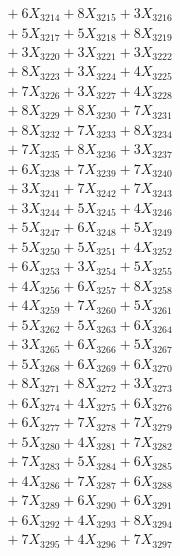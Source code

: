 \documentclass[a4paper,10pt]{article}
\begin{document}
{\begin{align}
&\;  + 6 X_{3214} + 8 X_{3215} + 3 X_{3216} \\[0.3ex]
&\;  + 5 X_{3217} + 5 X_{3218} + 8 X_{3219} \\[0.5ex]\allowbreak
&\;  + 3 X_{3220} + 3 X_{3221} + 3 X_{3222} \\[0.3ex]
&\;  + 8 X_{3223} + 3 X_{3224} + 4 X_{3225} \\[0.3ex]
&\;  + 7 X_{3226} + 3 X_{3227} + 4 X_{3228} \\[0.3ex]
&\;  + 8 X_{3229} + 8 X_{3230} + 7 X_{3231} \\[0.3ex]
&\;  + 8 X_{3232} + 7 X_{3233} + 8 X_{3234} \\[0.3ex]
&\;  + 7 X_{3235} + 8 X_{3236} + 3 X_{3237} \\[0.3ex]
&\;  + 6 X_{3238} + 7 X_{3239} + 7 X_{3240} \\[0.3ex]
&\;  + 3 X_{3241} + 7 X_{3242} + 7 X_{3243} \\[0.3ex]
&\;  + 3 X_{3244} + 5 X_{3245} + 4 X_{3246} \\[0.3ex]
&\;  + 5 X_{3247} + 6 X_{3248} + 5 X_{3249} \\[0.5ex]\allowbreak
&\;  + 5 X_{3250} + 5 X_{3251} + 4 X_{3252} \\[0.3ex]
&\;  + 6 X_{3253} + 3 X_{3254} + 5 X_{3255} \\[0.3ex]
&\;  + 4 X_{3256} + 6 X_{3257} + 8 X_{3258} \\[0.3ex]
&\;  + 4 X_{3259} + 7 X_{3260} + 5 X_{3261} \\[0.3ex]
&\;  + 5 X_{3262} + 5 X_{3263} + 6 X_{3264} \\[0.3ex]
&\;  + 3 X_{3265} + 6 X_{3266} + 5 X_{3267} \\[0.3ex]
&\;  + 5 X_{3268} + 6 X_{3269} + 6 X_{3270} \\[0.3ex]
&\;  + 8 X_{3271} + 8 X_{3272} + 3 X_{3273} \\[0.3ex]
&\;  + 6 X_{3274} + 4 X_{3275} + 6 X_{3276} \\[0.3ex]
&\;  + 6 X_{3277} + 7 X_{3278} + 7 X_{3279} \\[0.5ex]\allowbreak
&\;  + 5 X_{3280} + 4 X_{3281} + 7 X_{3282} \\[0.3ex]
&\;  + 7 X_{3283} + 5 X_{3284} + 6 X_{3285} \\[0.3ex]
&\;  + 4 X_{3286} + 7 X_{3287} + 6 X_{3288} \\[0.3ex]
&\;  + 7 X_{3289} + 6 X_{3290} + 6 X_{3291} \\[0.3ex]
&\;  + 6 X_{3292} + 4 X_{3293} + 8 X_{3294} \\[0.3ex]
&\;  + 7 X_{3295} + 4 X_{3296} + 7 X_{3297} \\[0.3ex]

\end{align}}
\end{document}
